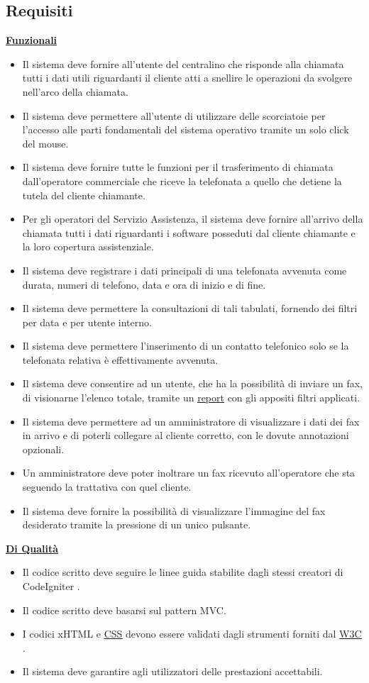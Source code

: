 \subsection{Requisiti}
\underline{\textbf{Funzionali}}
\begin{itemize}
\item Il sistema deve fornire all'utente del centralino che risponde alla chiamata tutti i dati utili riguardanti il cliente atti a snellire le operazioni da svolgere nell'arco della chiamata.
\item Il sistema deve permettere all'utente di utilizzare delle scorciatoie per l'accesso alle parti fondamentali del sistema operativo tramite un solo click del mouse.
\item Il sistema deve fornire tutte le funzioni per il trasferimento di chiamata dall'operatore commerciale che riceve la telefonata a quello che detiene la tutela del cliente chiamante.
\item Per gli operatori del Servizio Assistenza, il sistema deve fornire all'arrivo della chiamata tutti i dati riguardanti i software posseduti dal cliente chiamante e la loro copertura assistenziale.
\item Il sistema deve registrare i dati principali di una telefonata avvenuta come durata, numeri di telefono, data e ora di inizio e di fine. 
\item Il sistema deve permettere la consultazioni di tali tabulati, fornendo dei filtri per data e per utente interno. 
\item Il sistema deve permettere l'inserimento di un contatto telefonico solo se la telefonata relativa \`e effettivamente avvenuta.
\item Il sistema deve consentire ad un utente, che ha la possibilit\`a di inviare un fax, di visionarne l'elenco totale, tramite un \hyperlink{report}{\underline{report}} con gli appositi filtri applicati.
\item Il sistema deve permettere ad un amministratore di visualizzare i dati dei fax in arrivo e di poterli collegare al cliente corretto, con le dovute annotazioni opzionali. 
\item Un amministratore deve poter inoltrare un fax ricevuto all'operatore che sta seguendo la trattativa con quel cliente.
\item Il sistema deve fornire la possibilit\`a di visualizzare l'immagine del fax desiderato tramite la pressione di un unico pulsante.
\end{itemize}

\underline{\textbf{Di Qualit\`a}}
\begin{itemize}
\item Il codice scritto deve seguire le linee guida stabilite dagli stessi creatori di CodeIgniter \cite{cistyle}.
\item Il codice scritto deve basarsi sul pattern MVC.
\item I codici xHTML e \hyperlink{css}{\underline{CSS}} devono essere validati dagli strumenti forniti dal \hyperlink{w3c}{\underline{W3C}} \cite{due}.
\item Il sistema deve garantire agli utilizzatori delle prestazioni accettabili.
\end{itemize}

